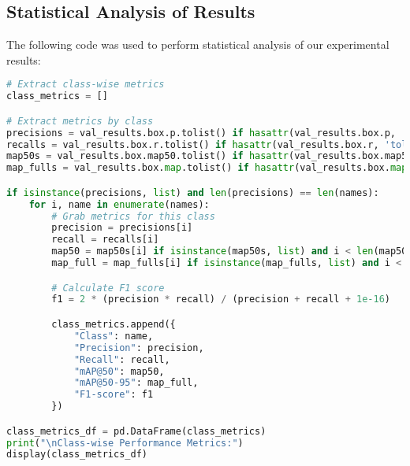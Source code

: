 \subsection{Statistical Analysis of Results}
\label{appendix:stats-code}

The following code was used to perform statistical analysis of our experimental results:

\begin{lstlisting}[language=Python, caption={Statistical Analysis of Experimental Results}, label={lst:stats}]
# Extract class-wise metrics
class_metrics = []

# Extract metrics by class
precisions = val_results.box.p.tolist() if hasattr(val_results.box.p, 'tolist') else val_results.box.p
recalls = val_results.box.r.tolist() if hasattr(val_results.box.r, 'tolist') else val_results.box.r
map50s = val_results.box.map50.tolist() if hasattr(val_results.box.map50, 'tolist') else val_results.box.map50
map_fulls = val_results.box.map.tolist() if hasattr(val_results.box.map, 'tolist') else val_results.box.map

if isinstance(precisions, list) and len(precisions) == len(names):
    for i, name in enumerate(names):
        # Grab metrics for this class
        precision = precisions[i]
        recall = recalls[i]
        map50 = map50s[i] if isinstance(map50s, list) and i < len(map50s) else None
        map_full = map_fulls[i] if isinstance(map_fulls, list) and i < len(map_fulls) else None

        # Calculate F1 score
        f1 = 2 * (precision * recall) / (precision + recall + 1e-16)

        class_metrics.append({
            "Class": name,
            "Precision": precision,
            "Recall": recall,
            "mAP@50": map50,
            "mAP@50-95": map_full,
            "F1-score": f1
        })

class_metrics_df = pd.DataFrame(class_metrics)
print("\nClass-wise Performance Metrics:")
display(class_metrics_df)
\end{lstlisting}

